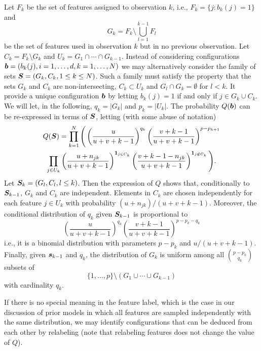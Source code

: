 Let $F_k$ be the set of features assigned to observation $k$, i.e., $F_k = \{j: b_k(j) = 1\}$ and
\[
G_{k} = F_k \setminus \bigcup_{l=1}^{k-1} F_{l}
\]
be the set of features used in observation $k$ but in no previous observation.  Let $C_k = F_k \setminus G_k$ and $U_k = G_1\cap \cdots \cap G_{k-1}$.  Instead of considering configurations ${\bm{b}} = (b_k(j), i=1, \ldots, d, k=1, \ldots, N)$ we may alternatively consider the family of sets
${\bm{S}} = (G_k, C_{k}, 1\leq  k \leq N)$.  Such a family must satisfy the property that the sets $G_{k}$ and $C_{k}$ are non-intersecting, 
$C_k \subset U_k$ and $G_l\cap G_k = \emptyset$ for $l<k$. It
provide a unique configuration ${\bm{b}}$ by letting $b_k(j) = 1$ if and only if $j\in G_k\cup C_k$. 
We will let, in the following, $q_k = |G_k|$ and $p_k = |U_k|$.
The probability $Q({\bm{b}})$ can be re-expressed in terms of ${\bm{S}}$, letting (with some abuse of notation)
\begin{multline*}
Q({\bm{S}}) = \prod_{k=1}^N \Bigg(
 \left(\frac{u}{u+v+k-1}\right)^{q_k} \left(\frac{v+k-1}{u+v+k-1}\right)^{p-p_{k+1}} \\
\prod_{j\in U_k} \left(\frac{u + n_{jk}}{u+v+k-1}\right)^{{\bm 1}_{j\in C_k}} \left(\frac{v+k-1-n_{jk}}{u+v+k-1}\right)^{{\bm 1}_{j\not\in C_k}} \Bigg).
\end{multline*}
Let ${\bm{S}}_k = (G_l, C_l, l\leq k)$. Then the expression of $Q$ shows that, conditionally to ${\bm{S}}_{k-1}$, $G_k$ and $C_k$ are independent. Elements in $C_k$ are chosen independently for each feature $j\in U_k$ with probability $(u + n_{jk})/(u+v+k-1)$.  Moreover, the conditional distribution of $q_k$ given ${\bm{S}}_{k-1}$ is proportional to
\[
 \left(\frac{u}{u+v+k-1}\right)^{q_k} \left(\frac{v+k-1}{u+v+k-1}\right)^{p-p_{k} - q_k}
 \]
i.e., it is a binomial distribution with parameters $p-p_k$ and $u/(u+v+k-1)$. Finally, given ${\bm{s}}_{k-1}$ and $q_k$, the distribution of $G_k$ is uniform among all  $\binom{p-p_k}{q_k}$ subsets of
\[
\{1, \ldots, p\} \setminus (G_1\cup \cdots\cup G_{k-1})
\]
with cardinality $q_k$.


If there is no special meaning in the feature label, which is the case in our discussion of prior models in which all features are sampled independently with the same distribution, we may identify configurations that can be deduced from each other by relabeling (note that relabeling features does not change the value of $Q$). 

